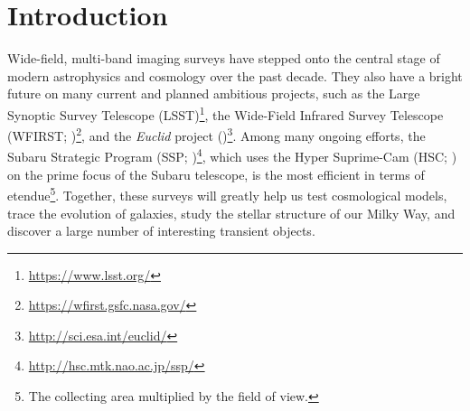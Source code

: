 \documentclass[useamsfonts]{pasj01}
\begin{document}
\section{Introduction}
    \label{sec:intro}

    Wide-field, multi-band imaging surveys have stepped onto the central stage of
    modern astrophysics and cosmology over the past decade.
    They also have a bright future on many current and planned ambitious projects, 
    such as the Large Synoptic Survey Telescope
    (LSST)\footnote{\url{https://www.lsst.org/}}, the Wide-Field Infrared Survey
    Telescope
    (WFIRST; \citealt{Dressler2012})\footnote{\url{https://wfirst.gsfc.nasa.gov/}},
    and the \textit{Euclid} project
    (\citealt{Laureijs2012})\footnote{\url{http://sci.esa.int/euclid/}}.
    Among many ongoing efforts, the Subaru Strategic Program
    (SSP; \citealt{HSCDR1})\footnote{\url{http://hsc.mtk.nao.ac.jp/ssp/}}, which
    uses the Hyper Suprime-Cam (HSC; \citealt{Miyazaki2012}) on the prime focus of
    the Subaru telescope, is the most efficient in terms of 
    etendue\footnote{The collecting area multiplied by the field of view.}.
    Together, these surveys will greatly help us test cosmological models, trace the
    evolution of galaxies, study the stellar structure of our Milky Way, and discover
    a large number of interesting transient objects.
\end{document}
